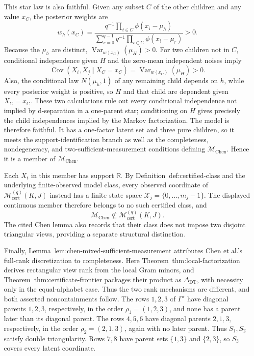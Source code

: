 This star law is also faithful.  Given any subset \(C\) of the other children and any value \(x_C\), the posterior weights are
\[
 w_h(x_C)
 =\frac{q^{-1}\prod_{i\in C}\phi(x_i-\mu_h)}
        {\sum_{r=0}^{q-1}q^{-1}\prod_{i\in C}\phi(x_i-\mu_r)}>0.
\]
Because the \(\mu_h\) are distinct, \(\operatorname{Var}_{w(x_C)}(\mu_H)>0\).  For two children not in \(C\), conditional independence given \(H\) and the zero-mean independent noises imply
\[
 \operatorname{Cov}(X_i,X_j\mid X_C=x_C)
 =\operatorname{Var}_{w(x_C)}(\mu_H)>0.
\]
Also, the conditional law \(N(\mu_h,1)\) of any remaining child depends on \(h\), while every posterior weight is positive, so \(H\) and that child are dependent given \(X_C=x_C\).  These two calculations rule out every conditional independence not implied by d-separation in a one-parent star; conditioning on \(H\) gives precisely the child independences implied by the Markov factorization.  The model is therefore faithful.  It has a one-factor latent set and three pure children, so it meets the support-identification branch as well as the completeness, nondegeneracy, and two-sufficient-measurement conditions defining \(\mathcal M_{\mathrm{Chen}}\).  Hence it is a member of \(\mathcal M_{\mathrm{Chen}}\).

Each \(X_i\) in this member has support \(\mathbb R\).  By Definition~\textnormal{def:certified-class} and the underlying finite-observed model class, every observed coordinate of \(\mathcal M_{\mathrm{cert}}^{(q)}(K,J)\) instead has a finite state space \(\mathcal X_j=\{0,\ldots,m_j-1\}\).  The displayed continuous member therefore belongs to no such certified class, and
\[
 \mathcal M_{\mathrm{Chen}}\not\subseteq
 \mathcal M_{\mathrm{cert}}^{(q)}(K,J).
\]
The cited Chen lemma also records that their class does not impose two disjoint triangular views, providing a separate structural distinction.

Finally, Lemma~\textnormal{lem:chen-mixed-sufficient-measurement} attributes Chen et al.'s full-rank discretization to completeness.  Here Theorem~\textnormal{thm:local-factorization} derives rectangular view rank from the local Gram minors, and Theorem~\textnormal{thm:certificate-frontier} packages their product as \(\Delta_{\mathrm{DT}}\), with necessity only in the equal-alphabet case.  Thus the two rank mechanisms are different, and both asserted noncontainments follow.
The rows \(1,2,3\) of \(\Gamma^{\star}\) have diagonal parents \(1,2,3\), respectively, in the order \(\rho_1=(1,2,3)\), and none has a parent later than its diagonal parent.  The rows \(4,5,6\) have diagonal parents \(2,1,3\), respectively, in the order \(\rho_2=(2,1,3)\), again with no later parent.  Thus \(S_1,S_2\) satisfy double triangularity.  Rows \(7,8\) have parent sets \(\{1,3\}\) and \(\{2,3\}\), so \(S_3\) covers every latent coordinate.

